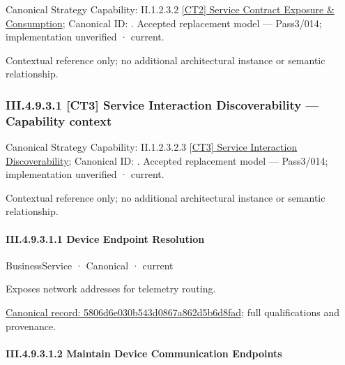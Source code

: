 {\small Canonical Strategy Capability: II.1.2.3.2 \hyperref[element:bee33783461e4d1bb0cd354c1fb8560e]{[CT2] Service Contract Exposure \& Consumption}; Canonical ID: \texttt{}. Accepted replacement model — Pass3/014; implementation unverified · current.}\par
Contextual reference only; no additional architectural instance or semantic relationship.\par
\subsubsection*{III.4.9.3.1 [CT3] Service Interaction Discoverability — Capability context}
\label{navigation:III.4.9.3.1}

{\small Canonical Strategy Capability: II.1.2.3.2.3 \hyperref[element:84a28d9f09684d3ba6446d0f7d6cdf7f]{[CT3] Service Interaction Discoverability}; Canonical ID: \texttt{}. Accepted replacement model — Pass3/014; implementation unverified · current.}\par
Contextual reference only; no additional architectural instance or semantic relationship.\par
\paragraph*{III.4.9.3.1.1 Device Endpoint Resolution}
\label{navigation:III.4.9.3.1.1}

\label{element:5806d6e030b543d0867a862d5b6d8fad}
{\small BusinessService · Canonical · current}\par

Exposes network addresses for telemetry routing.


{\footnotesize \href{../../../../../../../../continuum/business/business-service/5806d6e030b543d0867a862d5b6d8fad.md}{Canonical record: 5806d6e030b543d0867a862d5b6d8fad}; full qualifications and provenance.}\par
\paragraph*{III.4.9.3.1.2 Maintain Device Communication Endpoints}
\label{navigation:III.4.9.3.1.2}

